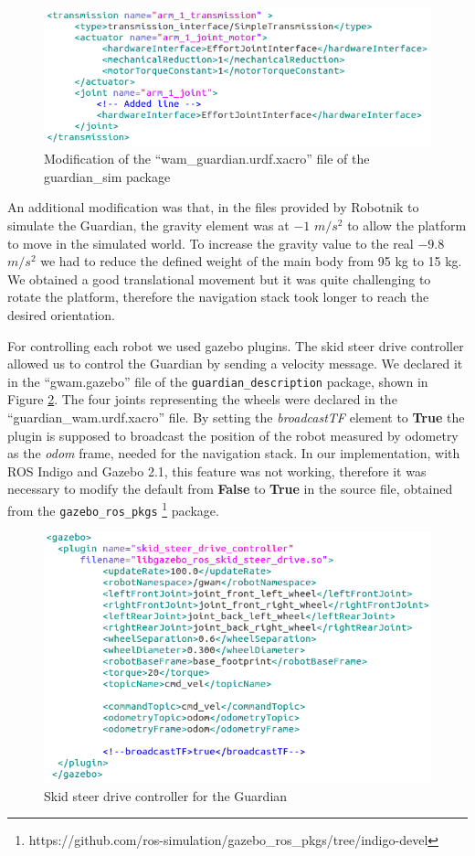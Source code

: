 \documentclass[11pt,a4paper]{article}
\begin{document}
\begin{figure}[ht]	
	\centering
	\includegraphics[width=12cm]{arm_trans.png}
	\caption{Modification of the ``wam\_guardian.urdf.xacro'' file of the guardian\_sim package}
	\label{fig:urdf}
\end{figure}



An additional modification was that, in the files provided by Robotnik to simulate the Guardian, the gravity element was at $-1$ $ m/s^2$ to allow the platform to move in the simulated world. To increase the gravity value to the real $-9.8$ $ m/s^2$ we had to reduce the defined weight of the main body from 95 kg to 15 kg. We obtained a good translational movement but it was quite challenging to rotate the platform, therefore the navigation stack took longer to reach the desired orientation. 


For controlling each robot we used gazebo plugins. The skid steer drive controller  allowed us to control the Guardian by sending a velocity message. We declared it in the 
``gwam.gazebo'' file of the \verb!guardian_description! package, shown in Figure \ref{fig:gcontrol}. The four joints representing the wheels were declared in the ``guardian\_wam.urdf.xacro'' file. By setting the \textit{broadcastTF} element to \textbf{True} the plugin is supposed to broadcast the position of the robot  measured by odometry as the \textit{odom} frame, needed for the navigation stack.  In our implementation, with ROS Indigo and Gazebo 2.1, this feature was not working, therefore it was necessary to modify the default from \textbf{False} to \textbf{True} in the source file, obtained from the \verb!gazebo_ros_pkgs! \footnote{https://github.com/ros-simulation/gazebo\_ros\_pkgs/tree/indigo-devel} package.



\begin{figure}[ht]	
	\centering
	\includegraphics[width=12cm]{gwam_gazebo.png}
	\caption{Skid steer drive controller for the Guardian}
	\label{fig:gcontrol}
\end{figure}
\end{document}
